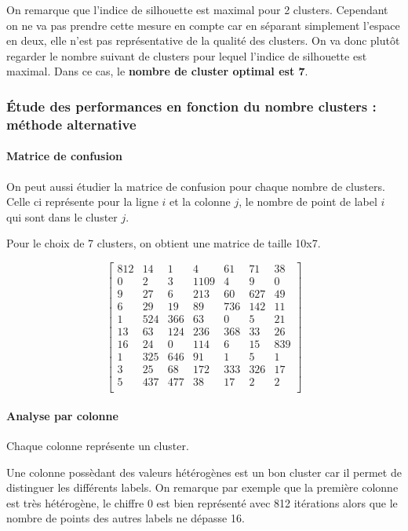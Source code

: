 \documentclass[french,a4paper,18pt]{article}
\begin{document}
On remarque que l'indice de silhouette est maximal pour 2 clusters. 
Cependant on ne va pas prendre cette mesure en compte car en séparant simplement l'espace en deux, 
elle n'est pas représentative de la qualité des clusters. 
On va donc plutôt regarder le nombre suivant de clusters pour lequel l'indice de silhouette est maximal. 
Dans ce cas, le \textbf{nombre de cluster optimal est 7}.

\subsubsection{Étude des performances en fonction du nombre clusters : méthode alternative}

\paragraph{Matrice de confusion}
On peut aussi étudier la matrice de confusion pour chaque nombre de clusters.
Celle ci représente pour la ligne $i$ et la colonne $j$, le nombre de point de label $i$ qui sont dans le cluster $j$.

Pour le choix de 7 clusters, on obtient une matrice de taille 10x7.

\[
\begin{bmatrix}
    812 & 14 & 1 & 4 & 61 & 71 & 38 \\
    0 & 2 & 3 & 1109 & 4 & 9 & 0 \\
    9 & 27 & 6 & 213 & 60 & 627 & 49 \\
    6 & 29 & 19 & 89 & 736 & 142 & 11 \\
    1 & 524 & 366 & 63 & 0 & 5 & 21 \\
    13 & 63 & 124 & 236 & 368 & 33 & 26 \\
    16 & 24 & 0 & 114 & 6 & 15 & 839 \\
    1 & 325 & 646 & 91 & 1 & 5 & 1 \\
    3 & 25 & 68 & 172 & 333 & 326 & 17 \\
    5 & 437 & 477 & 38 & 17 & 2 & 2 \\
    \end{bmatrix}
\]    


\paragraph{Analyse par colonne}
Chaque colonne représente un cluster.

Une colonne possèdant des valeurs hétérogènes est un bon cluster car il permet de distinguer les différents labels.
On remarque par exemple que la première colonne est très hétérogène, le chiffre 0 est bien représenté avec 812 itérations
alors que le nombre de points des autres labels ne dépasse 16.
\end{document}
